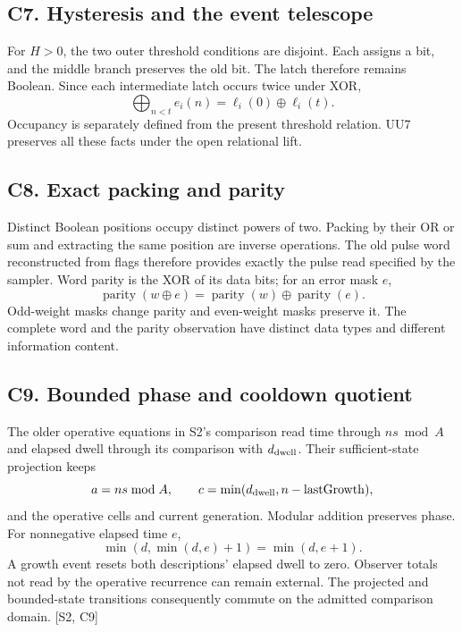 \documentclass[11pt,a4paper]{article}
\numberwithin{equation}{section}
\newcommand{\src}[2]{{\sffamily\small\color{slate}[#1, #2]}}
\newcommand{\xor}{\mathbin{\oplus}}
\begin{document}
\subsection*{C7. Hysteresis and the event telescope}
For $H>0$, the two outer threshold conditions are disjoint. Each assigns a bit, and the middle branch preserves the old bit. The latch therefore remains Boolean. Since each intermediate latch occurs twice under XOR,
\begin{equation}
\bigoplus_{n<t}e_i(n)=\ell_i(0)\xor\ell_i(t).
\end{equation}
Occupancy is separately defined from the present threshold relation. UU7 preserves all these facts under the open relational lift.

\subsection*{C8. Exact packing and parity}
Distinct Boolean positions occupy distinct powers of two. Packing by their OR or sum and extracting the same position are inverse operations. The old pulse word reconstructed from flags therefore provides exactly the pulse read specified by the sampler. Word parity is the XOR of its data bits; for an error mask $e$,
\begin{equation}
\operatorname{parity}(w\xor e)=
\operatorname{parity}(w)\xor\operatorname{parity}(e).
\end{equation}
Odd-weight masks change parity and even-weight masks preserve it. The complete word and the parity observation have distinct data types and different information content.

\subsection*{C9. Bounded phase and cooldown quotient}
The older operative equations in S2's comparison read time through $ns\bmod A$ and elapsed dwell through its comparison with $d_{\rm dwell}$. Their sufficient-state projection keeps
\begin{equation}
a=ns\bmod A,\qquad
c=\min(d_{\rm dwell},n-\mathrm{lastGrowth}),
\end{equation}
and the operative cells and current generation. Modular addition preserves phase. For nonnegative elapsed time $e$,
\begin{equation}
\min(d,\min(d,e)+1)=\min(d,e+1).
\end{equation}
A growth event resets both descriptions' elapsed dwell to zero. Observer totals not read by the operative recurrence can remain external. The projected and bounded-state transitions consequently commute on the admitted comparison domain. \src{S2}{C9}
\end{document}
